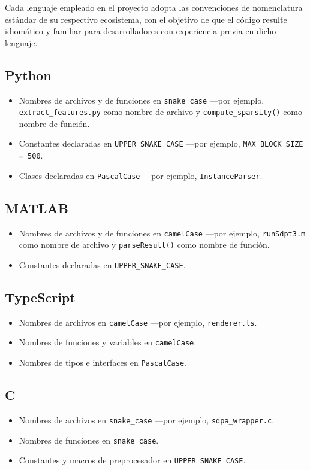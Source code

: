 Cada lenguaje empleado en el proyecto adopta las convenciones de
nomenclatura est\'andar de su respectivo ecosistema, con el objetivo de que
el c\'odigo resulte idiom\'atico y familiar para desarrolladores con
experiencia previa en dicho lenguaje.

\subsection{Python}
\begin{itemize}
    \item Nombres de archivos y de funciones en \texttt{snake\_case} —por
    ejemplo, \texttt{extract\_features.py} como nombre de archivo y
    \texttt{compute\_sparsity()} como nombre de funci\'on.
    \item Constantes declaradas en \texttt{UPPER\_SNAKE\_CASE} —por ejemplo,
    \texttt{MAX\_BLOCK\_SIZE = 500}.
    \item Clases declaradas en \texttt{PascalCase} —por ejemplo,
    \texttt{InstanceParser}.
\end{itemize}

\subsection{MATLAB}
\begin{itemize}
    \item Nombres de archivos y de funciones en \texttt{camelCase} —por
    ejemplo, \texttt{runSdpt3.m} como nombre de archivo y
    \texttt{parseResult()} como nombre de funci\'on.
    \item Constantes declaradas en \texttt{UPPER\_SNAKE\_CASE}.
\end{itemize}

\subsection{TypeScript}
\begin{itemize}
    \item Nombres de archivos en \texttt{camelCase} —por ejemplo,
    \texttt{renderer.ts}.
    \item Nombres de funciones y variables en \texttt{camelCase}.
    \item Nombres de tipos e interfaces en \texttt{PascalCase}.
\end{itemize}

\subsection{C}
\begin{itemize}
    \item Nombres de archivos en \texttt{snake\_case} —por ejemplo,
    \texttt{sdpa\_wrapper.c}.
    \item Nombres de funciones en \texttt{snake\_case}.
    \item Constantes y macros de preprocesador en \texttt{UPPER\_SNAKE\_CASE}.
\end{itemize}

